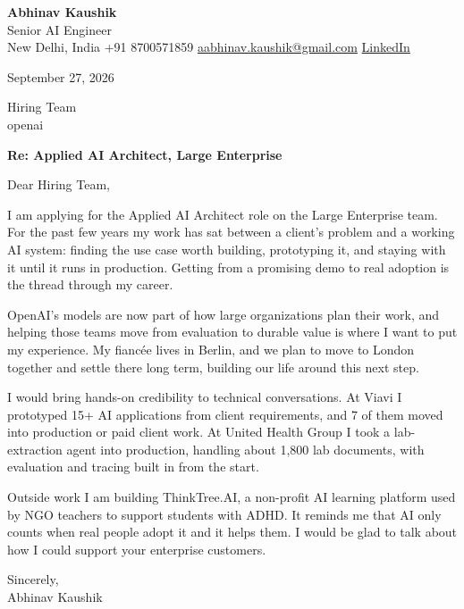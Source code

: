 \documentclass[11pt,a4paper]{article}
\begin{document}
{\Large\bfseries Abhinav Kaushik}\\
Senior AI Engineer\\
New Delhi, India \textbar{} +91 8700571859 \textbar{} \href{mailto:aabhinav.kaushik@gmail.com}{aabhinav.kaushik@gmail.com} \textbar{} \href{https://www.linkedin.com/in/abhinav-kaushik10/}{LinkedIn}  

September 27, 2026

Hiring Team\\
openai

\textbf{Re: Applied AI Architect, Large Enterprise}

Dear Hiring Team,

I am applying for the Applied AI Architect role on the Large Enterprise team. For the past few years my work has sat between a client's problem and a working AI system: finding the use case worth building, prototyping it, and staying with it until it runs in production. Getting from a promising demo to real adoption is the thread through my career.

OpenAI's models are now part of how large organizations plan their work, and helping those teams move from evaluation to durable value is where I want to put my experience. My fiancée lives in Berlin, and we plan to move to London together and settle there long term, building our life around this next step.

I would bring hands-on credibility to technical conversations. At Viavi I prototyped 15+ AI applications from client requirements, and 7 of them moved into production or paid client work. At United Health Group I took a lab-extraction agent into production, handling about 1,800 lab documents, with evaluation and tracing built in from the start.

Outside work I am building ThinkTree.AI, a non-profit AI learning platform used by NGO teachers to support students with ADHD. It reminds me that AI only counts when real people adopt it and it helps them. I would be glad to talk about how I could support your enterprise customers.

Sincerely,\\[4pt]
Abhinav Kaushik
\end{document}
